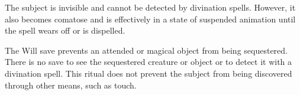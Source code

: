\begin{spelleffect}
The subject is invisible and cannot be detected by divination spells. However, it also becomes comatose and is effectively in a state of suspended animation until the spell wears off or is dispelled.
\end{spelleffect}
\begin{spellnotes}
The Will save prevents an attended or magical object from being sequestered. There is no save to see the sequestered creature or object or to detect it with a divination spell. This ritual does not prevent the subject from being discovered through other means, such as touch.
\end{spellnotes}

